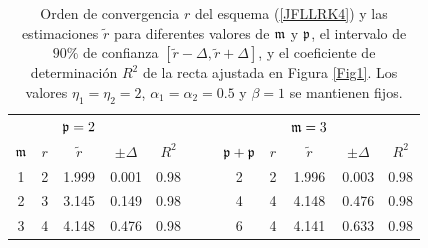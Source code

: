 \begin{table}[htb]
	\centering
	\caption{
		Orden de convergencia $r$ del esquema (\ref{JFLLRK4}) y las estimaciones $\widetilde{r}$ para diferentes valores de $\mathfrak{m}$ y $\mathfrak{p}$, el intervalo de $90\%$ de confianza $[\widetilde{r}-\varDelta,\widetilde{r}+\varDelta]$, y el coeficiente de determinación $R^2$ de la recta ajustada en Figura \ref{Fig1}. Los valores $\eta_1=\eta_2=2$, $\alpha_1=\alpha_2=0.5$ y $\beta=1$ se mantienen fijos.}
	\begin{adjustbox}{width=0.8\columnwidth,center}
		\begin{tabular}{cccccllccccc}
			\cline{1-12}
			&  & $\mathfrak{p}=2$ &  &  &  &  &  &  & $\mathfrak{m}=3$ &  &  \\ \cline{2-5}\cline{9-12}
			$\mathfrak{m}$ & $r$ & $\widetilde{r}$ & $\pm \varDelta$ & $R^{2}$ &  &  & $\mathfrak{p}+\mathfrak{p}$
			& $r$ & $\widetilde{r}$ & $\pm \varDelta$ & $R^{2}$ \\ 
			\cline{1-5}\cline{8-12}
			1 & 2 & 1.999 & 0.001 & 0.98 &  &  & 2 & 2 & 1.996 & 0.003 & 0.98 \\ 
			2 & 3 & 3.145 & 0.149 & 0.98 &  &  & 4 & 4 & 4.148 & 0.476 & 0.98 \\ 
			3 & 4 & 4.148 & 0.476 & 0.98 &  &  & 6 & 4 & 4.141 & 0.633 & 0.98 \\ 
			\cline{1-12}
		\end{tabular}
	\end{adjustbox}
	\label{tab:mporders}
\end{table}


